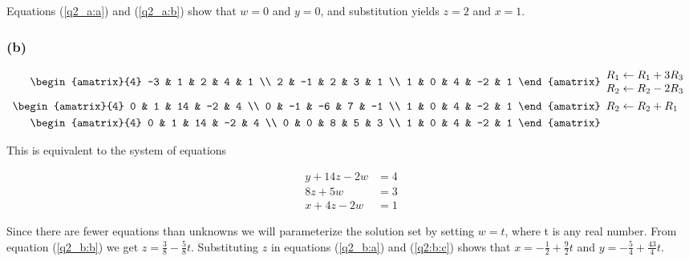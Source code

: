 \documentclass{article}
\begin{document}
Equations (\ref{q2_a:a}) and (\ref{q2_a:b}) show that $w = 0$ and
$y = 0$, and substitution yields $z = 2$ and $x = 1$.

\subsubsection*{(b)}

\begin{align}
 \begin{amatrix}{4}
  -3 &  1 & 2 &  4 & 1 \\
   2 & -1 & 2 &  3 & 1 \\
   1 &  0 & 4 & -2 & 1
 \end{amatrix}&
 \begin{array}{l}
  R_1 \leftarrow R_1 + 3R_3 \\ R_2 \leftarrow R_2 - 2R_3
 \end{array}
 \nonumber \\
 \begin{amatrix}{4}
  0 &  1 & 14 & -2 &  4 \\
  0 & -1 & -6 &  7 & -1 \\
  1 &  0 &  4 & -2 &  1
 \end{amatrix}&
 \begin{array}{l}
  R_2 \leftarrow R_2 + R_1
 \end{array}
 \nonumber \\
 \begin{amatrix}{4}
  0 & 1 & 14 & -2 & 4 \\
  0 & 0 &  8 &  5 & 3 \\
  1 & 0 &  4 & -2 & 1
 \end{amatrix}&
 \nonumber
\end{align}

This is equivalent to the system of equations

\begin{align}
 y + 14z -2w &= 4 \label{q2_b:a} \\
 8z + 5w &= 3 \label{q2_b:b} \\
 x + 4z -2w &= 1
\end{align}

Since there are fewer equations than unknowns we will parameterize the 
solution set by setting $w = t$, where t is any real number.  From equation 
(\ref{q2_b:b}) we get $z = \frac{3}{8} - \frac{5}{8}t$.  Substituting $z$ in 
equations (\ref{q2_b:a}) and (\ref{q2:b:c}) shows that $x = -\frac{1}{2} + 
\frac{9}{2}t$ and $y = -\frac{5}{4} + \frac{43}{4}t$.
\end{document}
